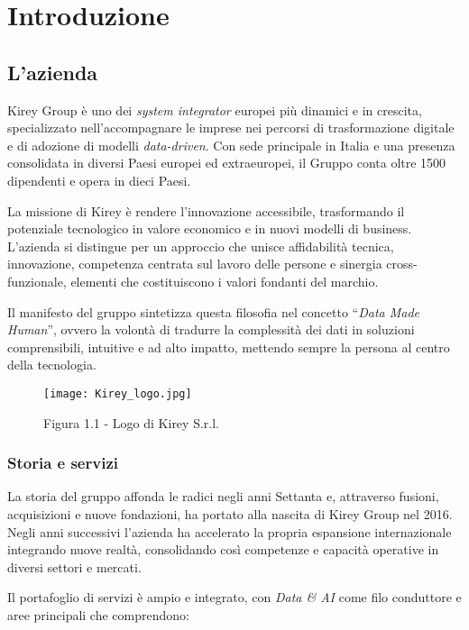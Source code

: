 \chapter{Introduzione}
\label{cap:introduzione}

\section{L'azienda}

Kirey Group è uno dei \emph{system integrator} europei più dinamici e in crescita, specializzato nell'accompagnare le imprese nei percorsi di trasformazione digitale
 e di adozione di modelli \emph{data-driven}. Con sede principale in Italia e una presenza consolidata in diversi Paesi europei ed extraeuropei, 
 il Gruppo conta oltre 1500 dipendenti e opera in dieci Paesi.

La missione di Kirey è rendere l'innovazione accessibile, trasformando il potenziale tecnologico in valore economico e in nuovi modelli di business. 
L'azienda si distingue per un approccio che unisce affidabilità tecnica, innovazione, competenza centrata sul lavoro delle persone e sinergia cross-funzionale, 
elementi che costituiscono i valori fondanti del marchio.

Il manifesto del gruppo sintetizza questa filosofia nel concetto “\emph{Data Made Human}”, ovvero la volontà di tradurre la complessità dei dati in soluzioni comprensibili, 
intuitive e ad alto impatto, mettendo sempre la persona al centro della tecnologia.

\begin{figure}[!h] 
    \centering 
    \texttt{[image: Kirey\_logo.jpg]} 
    \caption{Figura 1.1 - Logo di Kirey S.r.l.}
\end{figure}


\subsection{Storia e servizi}

La storia del gruppo affonda le radici negli anni Settanta e, attraverso fusioni, acquisizioni e nuove fondazioni, ha portato alla nascita di Kirey Group nel 2016. 
Negli anni successivi l'azienda ha accelerato la propria espansione internazionale integrando nuove realtà, consolidando così competenze e capacità operative in diversi settori e mercati.

Il portafoglio di servizi è ampio e integrato, con \emph{Data \& AI} come filo conduttore e aree principali che comprendono:

